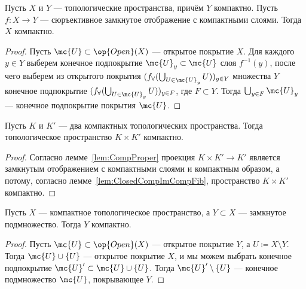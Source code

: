 \documentclass[
	extrafontsizes,
	11pt,
	hyphens,
]{memoir}
\begin{document}
\begin{lemma}
Пусть \(X\) и \(Y\) --- топологические пространства, причём \(Y\) компактно.
Пусть \(f : X \to Y\) --- сюръективное замкнутое отображение с компактными слоями.
\label{lem:ClosedCompImCompFib}
Тогда \(X\) компактно.
\end{lemma}

\begin{proof}
Пусть \(\mc{U} \subset \op{Open}(X)\) --- открытое покрытие \(X\). Для каждого \(y \in Y\) выберем конечное подпокрытие \(\mc{U}_y \subset \mc{U}\) слоя \(f^{-1}(y)\), после чего выберем из открытого покрытия \((f_\forall(\bigcup_{U \in \mc{U}_y} U))_{y \in Y}\) множества \(Y\) конечное подпокрытие \((f_\forall(\bigcup_{U \in \mc{U}_y} U))_{y \in F}\), где \(F \subset Y\). Тогда \(\bigcup_{y \in F} \mc{U}_y\) --- конечное подпокрытие покрытия \(\mc{U}\).
\end{proof}


\begin{lemma}
Пусть \(K\) и \(K'\) --- два компактных топологических пространства.
Тогда топологическое пространство \(K \times K'\) компактно.
\end{lemma}

\begin{proof}
Согласно лемме~\ref{lem:CompProper} проекция \(K \times K' \to K'\) является замкнутым отображением с компактными слоями и компактным образом, а потому, согласно лемме~\ref{lem:ClosedCompImCompFib}, пространство \(K \times K'\) компактно.
\end{proof}

\begin{lemma}
Пусть \(X\) --- компактное топологическое пространство, а \(Y \subset X\) --- замкнутое подмножество.
\label{lem:ClosedSubsComp}
Тогда \(Y\) компактно.
\end{lemma}

\begin{proof}
Пусть \(\mc{U} \subset \op{Open}(X)\) --- открытое покрытие \(Y\), а \(U \coloneqq X \setminus Y\). Тогда \(\mc{U} \cup \{U\}\) --- открытое покрытие \(X\), и мы можем выбрать конечное подпокрытие \(\mc{U}' \subset \mc{U} \cup \{U\}\). Тогда \(\mc{U}' \setminus \{U\}\) --- конечное подмножество \(\mc{U}\), покрывающее \(Y\).
\end{proof}
\end{document}
